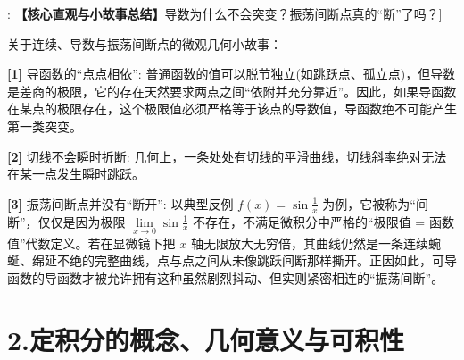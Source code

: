 \documentclass[11pt,a4paper,UTF8]{ctexart}
\begin{document}
\begin{thmbox}[原理[1]: \textbf{【核心直观与小故事总结】}导数为什么不会突变？振荡间断点真的“断”了吗？]

关于连续、导数与振荡间断点的微观几何小故事：

\textbf{[1]} 导函数的“点点相依”: 普通函数的值可以脱节独立(如跳跃点、孤立点)，但导数是差商的极限，它的存在天然要求两点之间“依附并充分靠近”。因此，如果导函数在某点的极限存在，这个极限值必须严格等于该点的导数值，导函数绝不可能产生第一类突变。

\textbf{[2]} 切线不会瞬时折断: 几何上，一条处处有切线的平滑曲线，切线斜率绝对无法在某一点发生瞬时跳跃。

\textbf{[3]} 振荡间断点并没有“断开”: 以典型反例 $f(x) = \sin\frac{1}{x}$ 为例，它被称为“间断”，仅仅是因为极限 $\lim\limits_{x \to 0} \sin\frac{1}{x}$ 不存在，不满足微积分中严格的“极限值 = 函数值”代数定义。若在显微镜下把 $x$ 轴无限放大无穷倍，其曲线仍然是一条连续蜿蜒、绵延不绝的完整曲线，点与点之间从未像跳跃间断那样撕开。正因如此，可导函数的导函数才被允许拥有这种虽然剧烈抖动、但实则紧密相连的“振荡间断”。

\end{thmbox}

\section{2.定积分的概念、几何意义与可积性}
\end{document}
